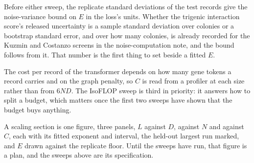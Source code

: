 Before either sweep, the replicate standard deviations of the test records give
the noise-variance bound on $E$ in the loss's units. Whether the trigenic
interaction score's released uncertainty is a sample standard deviation over
colonies or a bootstrap standard error, and over how many colonies, is already
recorded for the Kuzmin and Costanzo screens in the noise-computation note, and
the bound follows from it. That number is the first thing to set beside a fitted
$E$.

The cost per record of the transformer depends on how many gene tokens a record
carries and on the graph penalty, so $C$ is read from a profiler at each size
rather than from $6ND$. The IsoFLOP sweep is third in priority: it answers how to
split a budget, which matters once the first two sweeps have shown that the
budget buys anything.

A scaling section is one figure, three panels, $L$ against $D$, against $N$ and
against $C$, each with its fitted exponent and interval, the held-out largest run
marked, and $E$ drawn against the replicate floor. Until the sweeps have run, that
figure is a plan, and the sweeps above are its specification.
